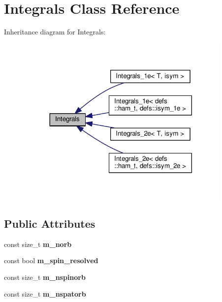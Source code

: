 \hypertarget{classIntegrals}{}\section{Integrals Class Reference}
\label{classIntegrals}


Inheritance diagram for Integrals\+:
\nopagebreak
\begin{figure}[H]
\begin{center}
\leavevmode
\includegraphics[width=296pt]{classIntegrals__inherit__graph}
\end{center}
\end{figure}
\subsection*{Public Attributes}
\begin{DoxyCompactItemize}
\item 
const size\+\_\+t {\bfseries m\+\_\+norb}\hypertarget{classIntegrals_a58fcfb338da894a36056842ab6bc8f5c}{}\label{classIntegrals_a58fcfb338da894a36056842ab6bc8f5c}

\item 
const bool {\bfseries m\+\_\+spin\+\_\+resolved}\hypertarget{classIntegrals_ad51ca862d06c5bd6279a2c658e6a0ea5}{}\label{classIntegrals_ad51ca862d06c5bd6279a2c658e6a0ea5}

\item 
const size\+\_\+t {\bfseries m\+\_\+nspinorb}\hypertarget{classIntegrals_a22ad03b1d5386dba7c1426f285cdd081}{}\label{classIntegrals_a22ad03b1d5386dba7c1426f285cdd081}

\item 
const size\+\_\+t {\bfseries m\+\_\+nspatorb}\hypertarget{classIntegrals_a5020b18ab8bdfede8b78c511025b5000}{}\label{classIntegrals_a5020b18ab8bdfede8b78c511025b5000}

\end{DoxyCompactItemize}
